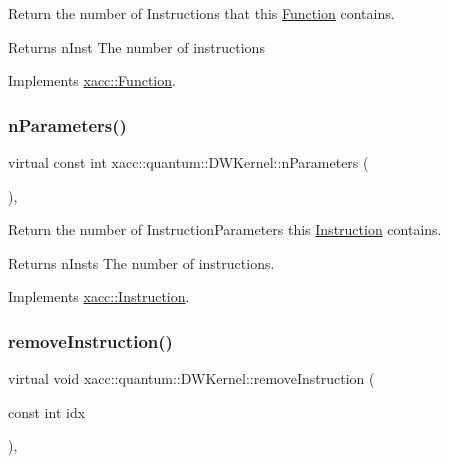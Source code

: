 Return the number of Instructions that this \hyperlink{a01653}{Function} contains.

\begin{DoxyReturn}{Returns}
n\+Inst The number of instructions 
\end{DoxyReturn}


Implements \hyperlink{a01653_a8901985525f59713e14c61713e07c086}{xacc\+::\+Function}.

\mbox{\label{a01221_a029429948329b94c1d89f32cf5c486d4}} 
\subsubsection{\texorpdfstring{n\+Parameters()}{nParameters()}}
{\footnotesize\ttfamily virtual const int xacc\+::quantum\+::\+D\+W\+Kernel\+::n\+Parameters (\begin{DoxyParamCaption}{ }\end{DoxyParamCaption})\hspace{0.3cm}{\ttfamily [inline]}, {\ttfamily [virtual]}}

Return the number of Instruction\+Parameters this \hyperlink{a01657}{Instruction} contains.

\begin{DoxyReturn}{Returns}
n\+Insts The number of instructions. 
\end{DoxyReturn}


Implements \hyperlink{a01657_ad54585d13c04ffd20296fff7ab8107ff}{xacc\+::\+Instruction}.

\mbox{\label{a01221_af2bcfd679e6cb89194f3f0bff8622b99}} 
\subsubsection{\texorpdfstring{remove\+Instruction()}{removeInstruction()}}
{\footnotesize\ttfamily virtual void xacc\+::quantum\+::\+D\+W\+Kernel\+::remove\+Instruction (\begin{DoxyParamCaption}\item[{const int}]{idx }\end{DoxyParamCaption})\hspace{0.3cm}{\ttfamily [inline]}, {\ttfamily [virtual]}}

